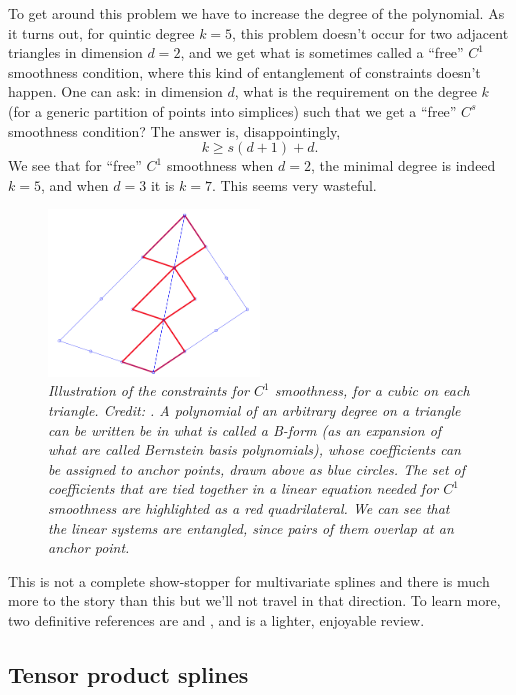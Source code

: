 \documentclass{article}
\begin{document}
To get around this problem we have to increase the degree of the polynomial. As
it turns out, for quintic degree $k=5$, this problem doesn't occur for two
adjacent triangles in dimension $d=2$, and we get what is sometimes called a
``free'' $C^1$ smoothness condition, where this kind of entanglement of
constraints doesn't happen. One can ask: in dimension $d$, what is the
requirement on the degree $k$ (for a generic partition of points into simplices)
such that we get a ``free'' $C^s$ smoothness condition? The answer is,
disappointingly,              
\[
k \geq s(d+1) + d.
\]
We see that for ``free'' $C^1$ smoothness when $d=2$, the minimal degree is
indeed $k=5$, and when $d=3$ it is $k=7$. This seems very wasteful.   

\begin{figure}[tb]
\centering
\includegraphics[width=0.5\textwidth]{c1_cubic.png}
\caption{\it Illustration of the constraints for $C^1$ smoothness, for a cubic
  on each triangle. Credit: \citet{deboor2009way}. A polynomial of an arbitrary
  degree on a triangle can be written be in what is called a B-form (as an
  expansion of what are called Bernstein basis polynomials), whose coefficients
  can be assigned to anchor points, drawn above as blue circles. The set of
  coefficients that are tied together in a linear equation needed for $C^1$
  smoothness are highlighted as a red quadrilateral. We can see that the linear
  systems are entangled, since pairs of them overlap at an anchor point.}     
\label{fig:c1_constraints}
\end{figure}

This is not a complete show-stopper for multivariate splines and there is much
more to the story than this but we'll not travel in that direction. To learn
more, two definitive references are \citet{deboor1993box} and
\citet{lai2007spline}, and \citet{deboor2009way} is a lighter, enjoyable review.  

\subsection{Tensor product splines}
\end{document}
